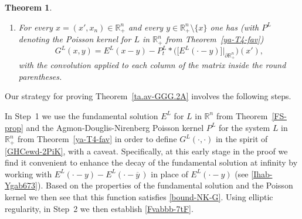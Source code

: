 \documentclass[11pt,reqno]{amsart}
\numberwithin{equation}{section}
\newtheorem{theorem}{Theorem}[section]
\theoremstyle{remark}
\begin{document}
\begin{theorem}
\begin{enumerate}
$\zeta\in{\mathscr{C}}^\infty_c({\mathbb{R}}^n)$ one has
%
\begin{equation}\label{mainest4G}
\begin{array}{c}
\zeta G^L(\cdot,y)\in\big[\mathring{W}^{1,p}({\mathbb{R}}^n_{+})\big]^{M\times M}
\,\,\text{ for each }\,\,y\in{\mathbb{R}}^n_{+}
\\[10pt]
\text{and }\,\,\sup_{y\in{\mathbb{R}}^n_{+}}
\big\|\zeta G^L(\cdot,y)\big\|_{[W^{1,p}({\mathbb{R}}^n_{+})]^{M\times M}}<+\infty,
\end{array}
\end{equation}
%
where $\mathring{W}^{1,p}({\mathbb{R}}^n_{+})$ stands for the closure of ${\mathscr{C}}^\infty_c({\mathbb{R}}^n)$ in 
$W^{1,p}({\mathbb{R}}^n_{+})$.

\vskip 0.08in
\item[(10)] For every $x=(x',x_n)\in{\mathbb{R}}^n_{+}$ and every $y\in{\mathbb{R}}^n_{+}\setminus\{x\}$ 
one has {\rm (}with $P^L$ denoting the Poisson kernel for $L$ in ${\mathbb{R}}^n_{+}$ from Theorem~\ref{ya-T4-fav}{\rm )}
%
\begin{equation}\label{GHCewd-2PiK}
G^L(x,y)=E^L(x-y)-P^L_t\ast\Big(\big[E^L(\cdot-y)\big]\big|_{\partial{\mathbb{R}}^n_{+}}\Big)(x'),
\end{equation}
%
with the convolution applied to each column of the matrix inside the round parentheses.
\end{enumerate}
\end{theorem}

Our strategy for proving Theorem~\ref{ta.av-GGG.2A} involves the following steps.

In Step~1 we use the fundamental solution $E^L$ for $L$ in ${\mathbb{R}}^n$ from Theorem~\ref{FS-prop} and 
the Agmon-Douglis-Nirenberg Poisson kernel $P^L$ for the system $L$ in ${\mathbb{R}}^n_{+}$ from Theorem~\ref{ya-T4-fav}
in order to define $G^L(\cdot,\cdot)$ in the spirit of \eqref{GHCewd-2PiK}, with a caveat. Specifically, at this early stage in the proof 
we find it convenient to enhance the decay of the fundamental solution at infinity by working with $E^L(\cdot-y)-E^L(\cdot-\overline{y}\,)$ 
in place of $E^L(\cdot-y)$ (see \eqref{Ihab-Ygab673}). Based on the properties of the fundamental solution and the Poisson kernel we then 
see that this function satisfies \eqref{bound-NK-G}. Using elliptic regularity, in Step~2 we then establish \eqref{Fvabbb-7tF}.
\end{document}
